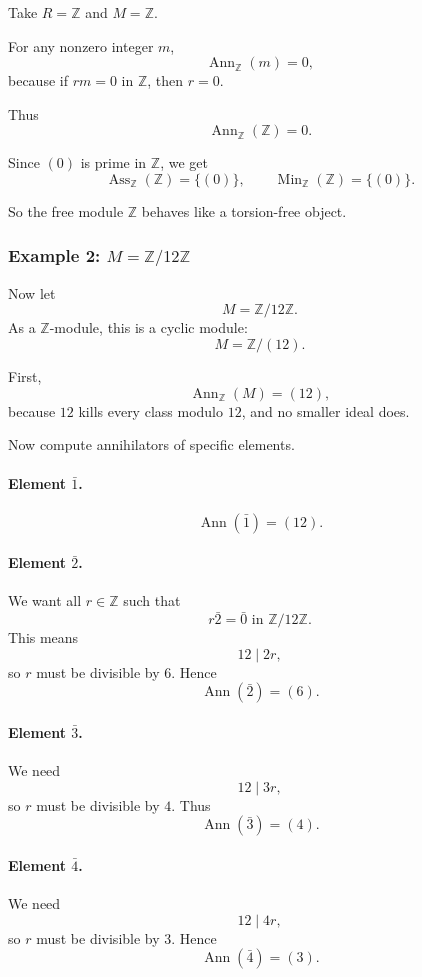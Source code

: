 \documentclass[12pt,a4paper,oneside]{report}
\DeclareMathOperator{\Ass}{Ass}
\DeclareMathOperator{\Ann}{Ann}
\DeclareMathOperator{\Min}{Min}
\theoremstyle{notespace}
\begin{document}
	Take \(R=\mathbb Z\) and \(M=\mathbb Z\).
	
	For any nonzero integer \(m\),
	\[
	\Ann_{\mathbb Z}(m)=0,
	\]
	because if \(rm=0\) in \(\mathbb Z\), then \(r=0\).
	
	Thus
	\[
	\Ann_{\mathbb Z}(\mathbb Z)=0.
	\]
	
	Since \((0)\) is prime in \(\mathbb Z\), we get
	\[
	\Ass_{\mathbb Z}(\mathbb Z)=\{(0)\},
	\qquad
	\Min_{\mathbb Z}(\mathbb Z)=\{(0)\}.
	\]
	
	So the free module \(\mathbb Z\) behaves like a torsion-free object.
	
	\subsubsection{Example 2: \(M=\mathbb Z/12\mathbb Z\)}
	
	Now let
	\[
	M=\mathbb Z/12\mathbb Z.
	\]
	As a \(\mathbb Z\)-module, this is a cyclic module:
	\[
	M=\mathbb Z/(12).
	\]
	
	First,
	\[
	\Ann_{\mathbb Z}(M)=(12),
	\]
	because \(12\) kills every class modulo \(12\), and no smaller ideal does.
	
	Now compute annihilators of specific elements.
	
	\paragraph{Element \(\bar 1\).}
	\[
	\Ann(\bar 1)=(12).
	\]
	
	\paragraph{Element \(\bar 2\).}
	We want all \(r\in \mathbb Z\) such that
	\[
	r\bar 2=\bar 0 \text{ in } \mathbb Z/12\mathbb Z.
	\]
	This means
	\[
	12\mid 2r,
	\]
	so \(r\) must be divisible by \(6\). Hence
	\[
	\Ann(\bar 2)=(6).
	\]
	
	\paragraph{Element \(\bar 3\).}
	We need
	\[
	12\mid 3r,
	\]
	so \(r\) must be divisible by \(4\). Thus
	\[
	\Ann(\bar 3)=(4).
	\]
	
	\paragraph{Element \(\bar 4\).}
	We need
	\[
	12\mid 4r,
	\]
	so \(r\) must be divisible by \(3\). Hence
	\[
	\Ann(\bar 4)=(3).
	\]
	
\end{document}
